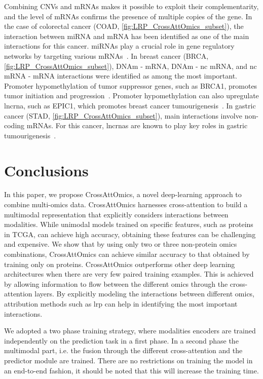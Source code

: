 \documentclass[../main.tex]{subfiles}
\begin{document}
	    Combining CNVs and mRNAs makes it possible to exploit their complementarity, and the level of mRNAs confirms the presence of multiple copies of the gene.
	    In the case of colorectal cancer (COAD, \cref{fig:LRP_CrossAttOmics_subset}),  the interaction between miRNA and mRNA has been identified as one of the main interactions for this cancer.
	    miRNAs play a crucial role in gene regulatory networks by targeting various mRNAs~\cite{Amirkhah2015}.
	    In breast cancer (BRCA, \cref{fig:LRP_CrossAttOmics_subset}), DNAm - mRNA, DNAm - nc mRNA, and nc mRNA - mRNA interactions were identified as among the most important.
	    Promoter hypomethylation of tumor suppressor genes, such as BRCA1, promotes tumor initiation and progression~\cite{Szyf2004}.
	    Promoter hypomethylation can also upregulate \gls{lncrna}, such as EPIC1, which promotes breast cancer tumourigenesis~\cite{Wang2018}.
	    In gastric cancer (STAD, \cref{fig:LRP_CrossAttOmics_subset}), main interactions involve non-coding mRNAs.
	    For this cancer, \glspl{lncrna} are known to play key roles in gastric tumourigenesis~\cite{Tan2020}.

\section{Conclusions}
	In this paper, we propose CrossAttOmics, a novel deep-learning approach to combine multi-omics data.
	CrossAttOmics harnesses cross-attention to build a multimodal representation that explicitly considers interactions between modalities.
	While unimodal models trained on specific features, such as proteins in TCGA, can achieve high accuracy, obtaining these features can be challenging and expensive.
	We show that by using only two or three non-protein omics combinations, CrossAttOmics can achieve similar accuracy to that obtained by training only on proteins.
	CrossAttOmics outperforms other deep learning architectures when there are very few paired training examples.
	This is achieved by allowing information to flow between the different omics through the cross-attention layers.
	By explicitly modeling the interactions between different omics, attribution methods such as \gls{lrp} can help in identifying the most important interactions.

	We adopted a two phase training strategy, where modalities encoders are trained independently on the prediction task in a first phase.
	In a second phase the multimodal part, i.e. the fusion through the different cross-attention and the predictor module are trained.
	There are no restrictions on training the model in an end-to-end fashion, it should be noted that this will increase the training time.
\end{document}
